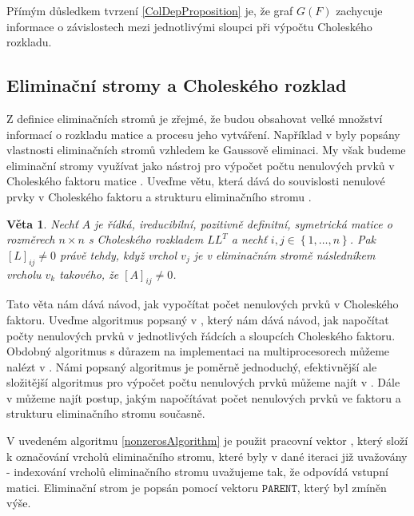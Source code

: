 \documentclass[11pt,american,czech,oneside]{book}
\theoremstyle{plain}
\newtheorem{theorem}{Věta}
\theoremstyle{definition}
\begin{document}
Přímým důsledkem tvrzení \ref{ColDepProposition} je, že graf $G(F)$ zachycuje informace o závislostech mezi jednotlivými sloupci při výpočtu Choleského rozkladu. 

\subsection{Eliminační stromy a Choleského rozklad}
Z definice eliminačních stromů je zřejmé, že budou obsahovat velké množství informací o rozkladu matice a procesu jeho vytváření. Například v \cite{schr:82} byly popsány vlastnosti eliminačních stromů vzhledem ke Gaussově eliminaci. My však budeme eliminační stromy využívat jako nástroj pro výpočet počtu nenulových prvků v Choleského faktoru matice \cite{liu:90}. Uveďme větu, která dává do souvislosti nenulové prvky v Choleského faktoru a strukturu eliminačního stromu \cite{liu:86}.

\begin{theorem}
  Nechť $A$ je řídká, ireducibilní, pozitivně definitní, symetrická matice o rozměrech $n \times n$ s Choleského rozkladem $LL^T$ a nechť $i,j \in \left\{1,\ldots,n \right\}$. Pak $[L]_{ij} \neq 0$ právě tehdy, když vrchol $v_j$ je v eliminačním stromě následníkem vrcholu $v_k$ takového, že $[A]_{ij} \neq 0$.
\end{theorem}

Tato věta nám dává návod, jak vypočítat počet nenulových prvků v Choleského faktoru. Uveďme algoritmus popsaný v \cite{liu:90}, který nám dává návod, jak napočítat počty nenulových prvků v jednotlivých řádcích a sloupcích Choleského faktoru. Obdobný algoritmus s důrazem na implementaci na multiprocesorech můžeme nalézt v \cite{zmgi:88}. Námi popsaný algoritmus je poměrně jednoduchý, efektivnější ale složitější algoritmus pro výpočet počtu nenulových prvků můžeme najít v \cite{gil:94}. Dále v \cite{basm:87} můžeme najít postup, jakým napočítávat počet nenulových prvků ve faktoru a strukturu eliminačního stromu současně.

V uvedeném algoritmu \ref{nonzerosAlgorithm} je použit pracovní vektor \Marker, který složí k označování vrcholů eliminačního stromu, které byly v dané iteraci již uvažovány - indexování vrcholů eliminačního stromu uvažujeme tak, že odpovídá vstupní matici. Eliminační strom je popsán pomocí vektoru $\texttt{PARENT}$, který byl zmíněn výše.
\end{document}

